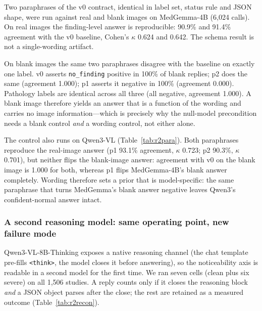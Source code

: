 Two paraphrases of the v0 contract, identical in label set, status rule and JSON shape, were run against real and blank images on MedGemma-4B (6,024 calls). On real images the finding-level answer is reproducible: 90.9\% and 91.4\% agreement with the v0 baseline, Cohen's $\kappa$ 0.624 and 0.642. The schema result is not a single-wording artifact.

On blank images the same two paraphrases disagree with the baseline on exactly one label. v0 asserts \texttt{no\_finding} positive in 100\% of blank replies; p2 does the same (agreement 1.000); p1 asserts it negative in 100\% (agreement 0.000). Pathology labels are identical across all three (all negative, agreement 1.000). A blank image therefore yields an answer that is a function of the wording and carries no image information---which is precisely why the null-model precondition needs a blank control \emph{and} a wording control, not either alone.

The control also runs on Qwen3-VL (Table~\ref{tab:r2para}). Both paraphrases reproduce the real-image answer (p1 93.1\% agreement, $\kappa$ 0.723; p2 90.3\%, $\kappa$ 0.701), but neither flips the blank-image answer: agreement with v0 on the blank image is 1.000 for both, whereas p1 flips MedGemma-4B's blank answer completely. Wording therefore sets a prior that is model-specific: the same paraphrase that turns MedGemma's blank answer negative leaves Qwen3's confident-normal answer intact.

\subsubsection{A second reasoning model: same operating point, new failure mode}
\label{sec:results-second}

Qwen3-VL-8B-Thinking exposes a native reasoning channel (the chat template pre-fills \texttt{<think>}, the model closes it before answering), so the noticeability axis is readable in a second model for the first time. We ran seven cells (clean plus six severe) on all 1,506 studies. A reply counts only if it closes the reasoning block \emph{and} a JSON object parses after the close; the rest are retained as a measured outcome (Table~\ref{tab:r2recon}).

